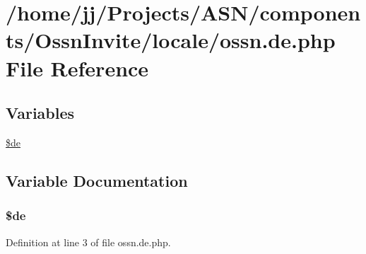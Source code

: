 \hypertarget{components_2_ossn_invite_2locale_2ossn_8de_8php}{}\section{/home/jj/\+Projects/\+A\+S\+N/components/\+Ossn\+Invite/locale/ossn.de.\+php File Reference}
\label{components_2_ossn_invite_2locale_2ossn_8de_8php}
\subsection*{Variables}
\begin{DoxyCompactItemize}
\item 
\hyperlink{components_2_ossn_invite_2locale_2ossn_8de_8php_aab7de7e51b4580005f63dd4cf5e17311}{\$de}
\end{DoxyCompactItemize}


\subsection{Variable Documentation}
\subsubsection[{\texorpdfstring{\$de}{$de}}]{\setlength{\rightskip}{0pt plus 5cm}\$de}\hypertarget{components_2_ossn_invite_2locale_2ossn_8de_8php_aab7de7e51b4580005f63dd4cf5e17311}{}\label{components_2_ossn_invite_2locale_2ossn_8de_8php_aab7de7e51b4580005f63dd4cf5e17311}


Definition at line 3 of file ossn.\+de.\+php.

